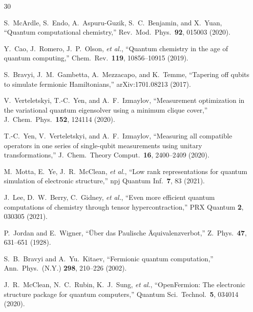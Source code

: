 \documentclass[aps,pra,twocolumn,superscriptaddress,longbibliography]{revtex4-2}
\begin{document}
\begin{thebibliography}{30}


S.~McArdle, S.~Endo, A.~Aspuru-Guzik, S.~C.~Benjamin, and X.~Yuan,
``Quantum computational chemistry,''
Rev.\ Mod.\ Phys.\ \textbf{92}, 015003 (2020).

Y.~Cao, J.~Romero, J.~P.~Olson, \textit{et al.},
``Quantum chemistry in the age of quantum computing,''
Chem.\ Rev.\ \textbf{119}, 10856--10915 (2019).


S.~Bravyi, J.~M.~Gambetta, A.~Mezzacapo, and K.~Temme,
``Tapering off qubits to simulate fermionic Hamiltonians,''
arXiv:1701.08213 (2017).

V.~Verteletskyi, T.-C.~Yen, and A.~F.~Izmaylov,
``Measurement optimization in the variational quantum eigensolver using a
minimum clique cover,''
J.\ Chem.\ Phys.\ \textbf{152}, 124114 (2020).

T.-C.~Yen, V.~Verteletskyi, and A.~F.~Izmaylov,
``Measuring all compatible operators in one series of single-qubit
measurements using unitary transformations,''
J.\ Chem.\ Theory Comput.\ \textbf{16}, 2400--2409 (2020).


M.~Motta, E.~Ye, J.~R.~McClean, \textit{et al.},
``Low rank representations for quantum simulation of electronic structure,''
npj Quantum Inf.\ \textbf{7}, 83 (2021).

J.~Lee, D.~W.~Berry, C.~Gidney, \textit{et al.},
``Even more efficient quantum computations of chemistry through tensor
hypercontraction,''
PRX Quantum \textbf{2}, 030305 (2021).


P.~Jordan and E.~Wigner,
``\"Uber das Paulische \"Aquivalenzverbot,''
Z.\ Phys.\ \textbf{47}, 631--651 (1928).

S.~B.~Bravyi and A.~Yu.~Kitaev,
``Fermionic quantum computation,''
Ann.\ Phys.\ (N.Y.) \textbf{298}, 210--226 (2002).


J.~R.~McClean, N.~C.~Rubin, K.~J.~Sung, \textit{et al.},
``OpenFermion: The electronic structure package for quantum computers,''
Quantum Sci.\ Technol.\ \textbf{5}, 034014 (2020).


\end{thebibliography}
\end{document}
